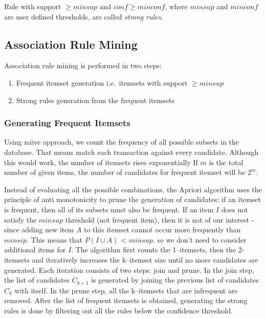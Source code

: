 Rule with support $\geq minsup$ and $conf\geq minconf$,
where $minsup$ and $minconf$ are user defined thresholds,
are called \emph{strong rules}.
	
\subsection{Association Rule Mining}

Association rule mining is performed in two steps:
\begin{enumerate}
	\item Frequent itemset generation i.e.\ itemsets with support $\geq minsup$
	\item Strong rules generation from the frequent itemsets 
\end{enumerate}

\subsubsection{Generating Frequent Itemsets}

Using na\"{\i}ve approach, we count the frequency of all possible subsets in the database. 
That means match each transaction against every candidate. 
Although this would work, the number of itemsets rises exponentially
If $m$ is the total number of given items, the number of candidates for frequent itemset will be $2^{m}$\cite{Han:2005:DMC:1076797}.

Instead of evaluating all the possible combinations, 
the Apriori algorithm\cite{Agrawal:1994:FAM:645920.672836} uses the principle of anti monotonicity to prune the generation of candidates: 
if an itemset is frequent, then all of its subsets must also be frequent.
If an item $I$ does not satisfy the $minsup$ threshold (not frequent item),
then it is not of our interest - since adding new item $A$ to this itemset cannot occur more frequently than $minsip$. 
This means that $P(I \cup A)$ < $minsup$, so we don’t need to consider additional items for $I$. 
The algorithm first counts the 1--itemsets, then the 2-itemsets and iteratively increases the k--itemset size until no more candidates are generated.
Each iteration consists of two steps: join and prune. 
In the join step, the list of candidates $C_{k+1}$ is generated by joining the previous list of candidates $ C_{k} $ with itself. 
In the prune step, all the k--itemsets that are infrequent are removed.
After the list of frequent itemsets is obtained, generating the strong rules is done by filtering out all the rules below the confidence threshold.

